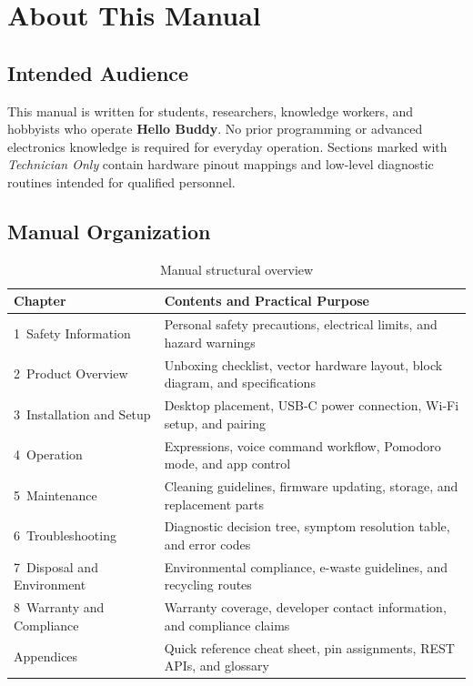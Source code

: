 \documentclass[11pt,a4paper,oneside]{report}
\newcommand{\hdr}[1]{\cellcolor{LightBlue}\textbf{#1}}
\newcommand{\ProductName}{Hello Buddy}
\begin{document}
\clearpage
\tableofcontents
\clearpage
\listoffigures
\clearpage
\listoftables
\clearpage
{}

\chapter*{About This Manual}

\section*{Intended Audience}
This manual is written for students, researchers, knowledge workers, and hobbyists who operate \textbf{\ProductName}. No prior programming or advanced electronics knowledge is required for everyday operation. Sections marked with \emph{Technician Only} contain hardware pinout mappings and low-level diagnostic routines intended for qualified personnel.

\section*{Manual Organization}
\begin{table}[H]\centering\small
\caption{Manual structural overview}
\begin{tabularx}{\linewidth}{|l|X|}\hline
\hdr{Chapter} & \hdr{Contents and Practical Purpose}\\ \hline
1~Safety Information & Personal safety precautions, electrical limits, and hazard warnings\\ \hline
2~Product Overview & Unboxing checklist, vector hardware layout, block diagram, and specifications\\ \hline
3~Installation and Setup & Desktop placement, USB-C power connection, Wi-Fi setup, and pairing\\ \hline
4~Operation & Expressions, voice command workflow, Pomodoro mode, and app control\\ \hline
5~Maintenance & Cleaning guidelines, firmware updating, storage, and replacement parts\\ \hline
6~Troubleshooting & Diagnostic decision tree, symptom resolution table, and error codes\\ \hline
7~Disposal and Environment & Environmental compliance, e-waste guidelines, and recycling routes\\ \hline
8~Warranty and Compliance & Warranty coverage, developer contact information, and compliance claims\\ \hline
Appendices & Quick reference cheat sheet, pin assignments, REST APIs, and glossary\\ \hline
\end{tabularx}
\end{table}
\end{document}
